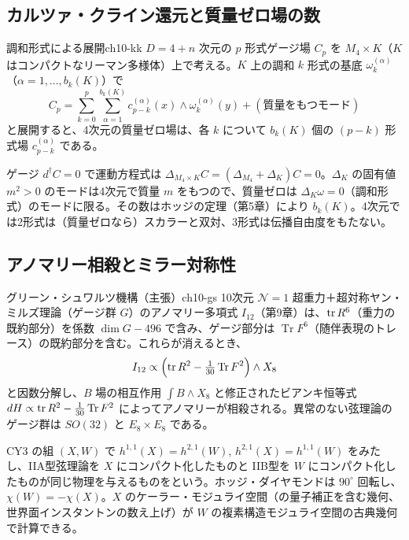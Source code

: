 \subsection{カルツァ・クライン還元と質量ゼロ場の数}

\begin{myprop}{調和形式による展開}{ch10-kk}
$D=4+n$ 次元の $p$ 形式ゲージ場 $C_p$ を $M_4\times K$（$K$ はコンパクトなリーマン多様体）上で考える。$K$ 上の調和 $k$ 形式の基底 $\omega^{(\alpha)}_k$（$\alpha=1,\dots,b_k(K)$）で
\[
C_p=\sum_{k=0}^{p}\sum_{\alpha=1}^{b_k(K)}c^{(\alpha)}_{p-k}(x)\wedge\omega_k^{(\alpha)}(y)+(\text{質量をもつモード})
\]
と展開すると、4次元の質量ゼロ場は、各 $k$ について $b_k(K)$ 個の $(p-k)$ 形式場 $c^{(\alpha)}_{p-k}$ である。
\end{myprop}
\begin{note}
ゲージ $d^\dagger C=0$ で運動方程式は $\Delta_{M_4\times K}C=(\Delta_{M_4}+\Delta_K)C=0$。$\Delta_K$ の固有値 $m^2>0$ のモードは4次元で質量 $m$ をもつので、質量ゼロは $\Delta_K\omega=0$（調和形式）のモードに限る。その数はホッジの定理（第5章）により $b_k(K)$。4次元では2形式は（質量ゼロなら）スカラーと双対、3形式は伝播自由度をもたない。
\end{note}

\subsection{アノマリー相殺とミラー対称性}

\begin{mythm}{グリーン・シュワルツ機構（主張）}{ch10-gs}
10次元 $\mathcal N=1$ 超重力＋超対称ヤン・ミルズ理論（ゲージ群 $G$）のアノマリー多項式 $I_{12}$（第9章）は、$\tr R^6$（重力の既約部分）を係数 $\dim G-496$ で含み、ゲージ部分は $\operatorname{Tr}F^6$（随伴表現のトレース）の既約部分を含む。これらが消えるとき、
\[
I_{12}\propto\Bigl(\tr R^2-\tfrac{1}{30}\operatorname{Tr}F^2\Bigr)\wedge X_8
\]
と因数分解し、$B$ 場の相互作用 $\int B\wedge X_8$ と修正されたビアンキ恒等式 $dH\propto\tr R^2-\tfrac{1}{30}\operatorname{Tr}F^2$ によってアノマリーが相殺される。異常のない弦理論のゲージ群は $SO(32)$ と $E_8\times E_8$ である。
\end{mythm}

\begin{physbox}[：ミラー対称性]
CY3 の組 $(X,W)$ で $h^{1,1}(X)=h^{2,1}(W)$, $h^{2,1}(X)=h^{1,1}(W)$ をみたし、IIA型弦理論を $X$ にコンパクト化したものと IIB型を $W$ にコンパクト化したものが同じ物理を与えるものをという。ホッジ・ダイヤモンドは $90^\circ$ 回転し、$\chi(W)=-\chi(X)$。$X$ のケーラー・モジュライ空間（の量子補正を含む幾何、世界面インスタントンの数え上げ）が $W$ の複素構造モジュライ空間の古典幾何で計算できる。
\end{physbox}

